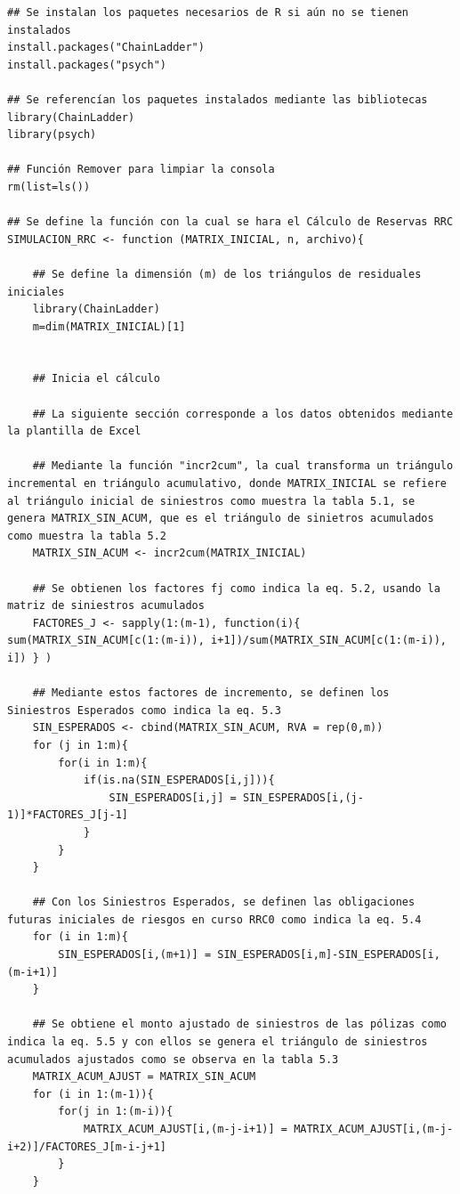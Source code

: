 \documentclass[11pt,twoside,openright,spanish]{report}
\numberwithin{equation}{chapter}
\numberwithin{figure}{chapter}
\numberwithin{table}{chapter}
\begin{document}
\begin{lstlisting}
## Se instalan los paquetes necesarios de R si aún no se tienen instalados
install.packages("ChainLadder")
install.packages("psych")

## Se referencían los paquetes instalados mediante las bibliotecas
library(ChainLadder)
library(psych)

## Función Remover para limpiar la consola
rm(list=ls())

## Se define la función con la cual se hara el Cálculo de Reservas RRC
SIMULACION_RRC <- function (MATRIX_INICIAL, n, archivo){
	
	## Se define la dimensión (m) de los triángulos de residuales iniciales
	library(ChainLadder)
	m=dim(MATRIX_INICIAL)[1]
	
	
	## Inicia el cálculo
	
	## La siguiente sección corresponde a los datos obtenidos mediante la plantilla de Excel
	
	## Mediante la función "incr2cum", la cual transforma un triángulo incremental en triángulo acumulativo, donde MATRIX_INICIAL se refiere al triángulo inicial de siniestros como muestra la tabla 5.1, se genera MATRIX_SIN_ACUM, que es el triángulo de sinietros acumulados como muestra la tabla 5.2
	MATRIX_SIN_ACUM <- incr2cum(MATRIX_INICIAL)
	
	## Se obtienen los factores fj como indica la eq. 5.2, usando la matriz de siniestros acumulados
	FACTORES_J <- sapply(1:(m-1), function(i){ sum(MATRIX_SIN_ACUM[c(1:(m-i)), i+1])/sum(MATRIX_SIN_ACUM[c(1:(m-i)), i]) } )
	
	## Mediante estos factores de incremento, se definen los Siniestros Esperados como indica la eq. 5.3
	SIN_ESPERADOS <- cbind(MATRIX_SIN_ACUM, RVA = rep(0,m))
	for (j in 1:m){
		for(i in 1:m){
			if(is.na(SIN_ESPERADOS[i,j])){
				SIN_ESPERADOS[i,j] = SIN_ESPERADOS[i,(j-1)]*FACTORES_J[j-1]
			}
		}
	}
	
	## Con los Siniestros Esperados, se definen las obligaciones futuras iniciales de riesgos en curso RRC0 como indica la eq. 5.4 
	for (i in 1:m){
		SIN_ESPERADOS[i,(m+1)] = SIN_ESPERADOS[i,m]-SIN_ESPERADOS[i,(m-i+1)]
	}
	
	## Se obtiene el monto ajustado de siniestros de las pólizas como indica la eq. 5.5 y con ellos se genera el triángulo de siniestros acumulados ajustados como se observa en la tabla 5.3
	MATRIX_ACUM_AJUST = MATRIX_SIN_ACUM
	for (i in 1:(m-1)){
		for(j in 1:(m-i)){
			MATRIX_ACUM_AJUST[i,(m-j-i+1)] = MATRIX_ACUM_AJUST[i,(m-j-i+2)]/FACTORES_J[m-i-j+1]
		}
	}
	

\end{lstlisting}
\end{document}
